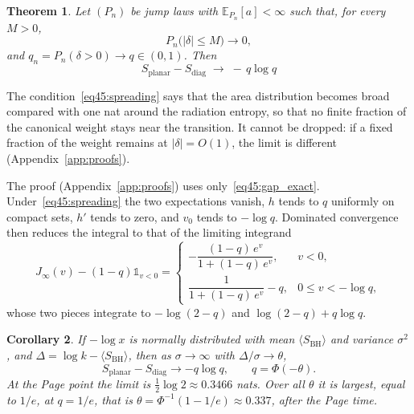 \documentclass[11pt,letterpaper]{article}
\theoremstyle{plain}
\newtheorem{theorem}{Theorem}[section]
\newtheorem{corollary}[theorem]{Corollary}
\theoremstyle{definition}
\theoremstyle{remark}
\begin{document}
\begin{theorem}
\label{thm45:limit}
Let $(P_n)$ be jump laws with $\mathbb{E}_{P_n}[a] < \infty$ such that, for every $M > 0$,
\begin{equation}
\label{eq45:spreading}
P_n\big(|\delta| \le M\big) \to 0 ,
\end{equation}
and $q_n = P_n(\delta > 0) \to q \in (0,1)$. Then
\begin{equation}
\label{eq45:limit}
\boxed{\;S_{\mathrm{planar}} - S_{\mathrm{diag}} \;\longrightarrow\; -\,q \log q \;}
\end{equation}
\end{theorem}

The condition~\eqref{eq45:spreading} says that the area distribution becomes broad compared with one nat around the radiation entropy, so that no finite fraction of the canonical weight stays near the transition. It cannot be dropped: if a fixed fraction of the weight remains at $|\delta| = O(1)$, the limit is different (Appendix~\ref{app:proofs}).

The proof (Appendix~\ref{app:proofs}) uses only~\eqref{eq45:gap_exact}. Under~\eqref{eq45:spreading} the two expectations vanish, $h$ tends to $q$ uniformly on compact sets, $h'$ tends to zero, and $v_0$ tends to $-\log q$. Dominated convergence then reduces the integral to that of the limiting integrand
\begin{equation}
\label{eq45:J_limit}
J_\infty(v) - (1-q)\mathbb{1}_{v<0} =
\begin{cases}
-\dfrac{(1-q)\, e^{v}}{1 + (1-q)\, e^{v}}, & v < 0, \\[2.2ex]
\dfrac{1}{1 + (1-q)\, e^{v}} - q, & 0 \le v < -\log q ,
\end{cases}
\end{equation}
whose two pieces integrate to $-\log(2-q)$ and $\log(2-q) + q\log q$.

\begin{corollary}
\label{thm45:gaussian}
If $-\log x$ is normally distributed with mean $\langle S_{\mathrm{BH}}\rangle$ and variance $\sigma^2$, and $\Delta = \log k - \langle S_{\mathrm{BH}}\rangle$, then as $\sigma \to \infty$ with $\Delta/\sigma \to \theta$,
\begin{equation}
S_{\mathrm{planar}} - S_{\mathrm{diag}} \to -q\log q, \qquad q = \Phi(-\theta) .
\end{equation}
At the Page point the limit is $\tfrac12\log 2 \approx 0.3466$ nats. Over all $\theta$ it is largest, equal to $1/e$, at $q = 1/e$, that is $\theta = \Phi^{-1}(1 - 1/e) \approx 0.337$, after the Page time.
\end{corollary}
\end{document}
